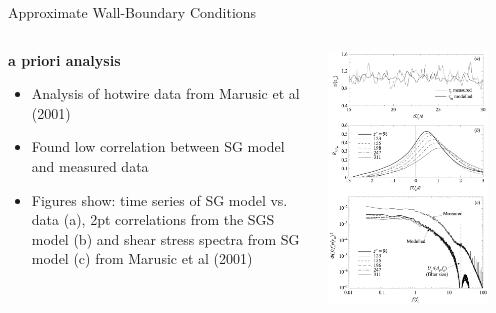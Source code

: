 \begin{frame}{Approximate Wall-Boundary Conditions}
\begin{columns}[T]
    \begin{column}{.55\textwidth}
    \begin{minipage}[c][.8\textheight][c]{\linewidth}
    \textbf{a priori analysis}
    \begin{itemize}
	\item Analysis of hotwire data from Marusic et al (2001)
	\item Found low correlation between SG model and measured data
	\item Figures show: time series of SG model vs. data (a), 2pt correlations from the SGS model (b) and shear stress spectra from SG model (c) from Marusic et al (2001)
\end{itemize}
      \end{minipage}
    \end{column}
    \begin{column}{.55\textwidth}
      \includegraphics[width=0.87\textwidth]{sbc6}
    \end{column}
  \end{columns}
\end{frame}
